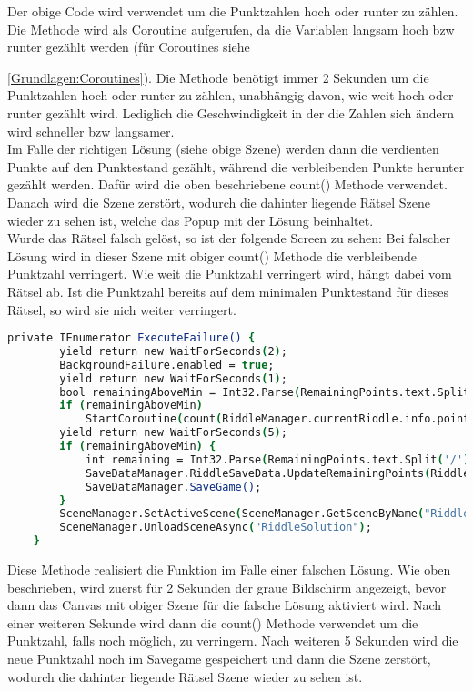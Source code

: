 Der obige Code wird verwendet um die Punktzahlen hoch oder runter zu zählen. Die Methode wird als Coroutine aufgerufen, da die Variablen langsam hoch bzw runter gezählt werden (für Coroutines siehe {\ref{Grundlagen:Coroutines}). Die Methode benötigt immer 2 Sekunden um die Punktzahlen hoch oder runter zu zählen, unabhängig davon, wie weit hoch oder runter gezählt wird. Lediglich die Geschwindigkeit in der die Zahlen sich ändern wird schneller bzw langsamer.\\

Im Falle der richtigen Lösung (siehe obige Szene) werden dann die verdienten Punkte auf den Punktestand gezählt, während die verbleibenden Punkte herunter gezählt werden. Dafür wird die oben beschriebene count() Methode verwendet. Danach wird die Szene zerstört, wodurch die dahinter liegende Rätsel Szene wieder zu sehen ist, welche das Popup mit der Lösung beinhaltet.\\

Wurde das Rätsel falsch gelöst, so ist der folgende Screen zu sehen:
Bei falscher Lösung wird in dieser Szene mit obiger count() Methode die verbleibende Punktzahl verringert. Wie weit die Punktzahl verringert wird, hängt dabei vom Rätsel ab. Ist die Punktzahl bereits auf dem minimalen Punktestand für dieses Rätsel, so wird sie nich weiter verringert.
\begin{lstlisting}[language=csh, caption={Methode für die Szene bei falschen Lösungen}]
private IEnumerator ExecuteFailure() {
        yield return new WaitForSeconds(2);
        BackgroundFailure.enabled = true;
        yield return new WaitForSeconds(1);
        bool remainingAboveMin = Int32.Parse(RemainingPoints.text.Split('/')[0]) > RiddleManager.currentRiddle.info.minPoints;
        if (remainingAboveMin)
            StartCoroutine(count(RiddleManager.currentRiddle.info.pointReduction, false, RemainingPoints));
        yield return new WaitForSeconds(5);
        if (remainingAboveMin) {
            int remaining = Int32.Parse(RemainingPoints.text.Split('/')[0]);
            SaveDataManager.RiddleSaveData.UpdateRemainingPoints(RiddleManager.riddleId, remaining);
            SaveDataManager.SaveGame();
        }
        SceneManager.SetActiveScene(SceneManager.GetSceneByName("Riddle"));
        SceneManager.UnloadSceneAsync("RiddleSolution");
    }
\end{lstlisting}
Diese Methode realisiert die Funktion im Falle einer falschen Lösung. Wie oben beschrieben, wird zuerst für 2 Sekunden der graue Bildschirm angezeigt, bevor dann das Canvas mit obiger Szene für die falsche Lösung aktiviert wird. Nach einer weiteren Sekunde wird dann die count() Methode verwendet um die Punktzahl, falls noch möglich, zu verringern. Nach weiteren 5 Sekunden wird die neue Punktzahl noch im Savegame gespeichert und dann die Szene zerstört, wodurch die dahinter liegende Rätsel Szene wieder zu sehen ist.

}
